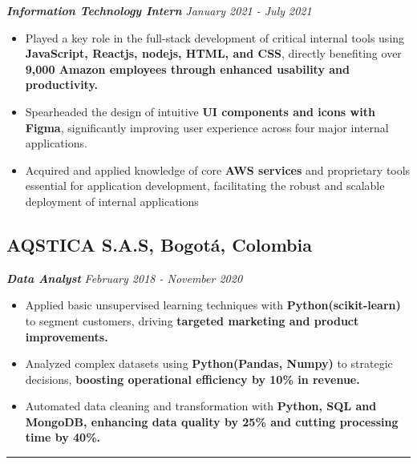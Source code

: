 \documentclass[10pt,a4paper]{article}
\begin{document}
{\fontsize{11}{12} \textbf{\textit{Information Technology Intern}}} \hfill \textit{January 2021 - July 2021}
\begin{itemize}[noitemsep]
    \item Played a key role in the full-stack development of critical internal tools using \textbf{JavaScript, Reactjs, nodejs, HTML, and CSS}, directly benefiting over \textbf{9,000 Amazon employees through enhanced usability and productivity.}
    \item Spearheaded the design of intuitive \textbf{UI components and icons with Figma}, significantly improving user experience across four major internal applications.
    \item Acquired and applied knowledge of core \textbf{AWS services} and proprietary tools essential for application development, facilitating the robust and scalable deployment of internal applications
\end{itemize}


\subsection*{AQSTICA S.A.S, Bogotá, Colombia}
{\fontsize{11}{12} \textbf{\textit{Data Analyst}}} \hfill \textit{February 2018 - November 2020}
\begin{itemize}[noitemsep]
    \item Applied basic unsupervised learning techniques with \textbf{Python(scikit-learn)} to segment customers, driving \textbf{targeted marketing and product improvements.}
    \item Analyzed complex datasets using \textbf{Python(Pandas, Numpy)} to strategic decisions, \textbf{boosting operational efficiency by 10\% in revenue.}
    \item Automated data cleaning and transformation with \textbf{Python, SQL and MongoDB, enhancing data quality by 25\% and cutting processing time by 40\%.}
\end{itemize}
\rule{\textwidth}{0.4pt} 
\end{document}
